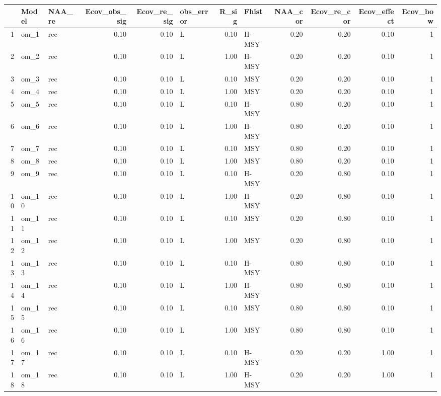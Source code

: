 \begin{table}[ht]
\centering
\begin{tabular}{rllrrlrlrrrr}
  \hline
 & Model & NAA\_re & Ecov\_obs\_sig & Ecov\_re\_sig & obs\_error & R\_sig & Fhist & NAA\_cor & Ecov\_re\_cor & Ecov\_effect & Ecov\_how \\ 
  \hline
1 & om\_1 & rec & 0.10 & 0.10 & L & 0.10 & H-MSY & 0.20 & 0.20 & 0.10 &   1 \\ 
  2 & om\_2 & rec & 0.10 & 0.10 & L & 1.00 & H-MSY & 0.20 & 0.20 & 0.10 &   1 \\ 
  3 & om\_3 & rec & 0.10 & 0.10 & L & 0.10 & MSY & 0.20 & 0.20 & 0.10 &   1 \\ 
  4 & om\_4 & rec & 0.10 & 0.10 & L & 1.00 & MSY & 0.20 & 0.20 & 0.10 &   1 \\ 
  5 & om\_5 & rec & 0.10 & 0.10 & L & 0.10 & H-MSY & 0.80 & 0.20 & 0.10 &   1 \\ 
  6 & om\_6 & rec & 0.10 & 0.10 & L & 1.00 & H-MSY & 0.80 & 0.20 & 0.10 &   1 \\ 
  7 & om\_7 & rec & 0.10 & 0.10 & L & 0.10 & MSY & 0.80 & 0.20 & 0.10 &   1 \\ 
  8 & om\_8 & rec & 0.10 & 0.10 & L & 1.00 & MSY & 0.80 & 0.20 & 0.10 &   1 \\ 
  9 & om\_9 & rec & 0.10 & 0.10 & L & 0.10 & H-MSY & 0.20 & 0.80 & 0.10 &   1 \\ 
  10 & om\_10 & rec & 0.10 & 0.10 & L & 1.00 & H-MSY & 0.20 & 0.80 & 0.10 &   1 \\ 
  11 & om\_11 & rec & 0.10 & 0.10 & L & 0.10 & MSY & 0.20 & 0.80 & 0.10 &   1 \\ 
  12 & om\_12 & rec & 0.10 & 0.10 & L & 1.00 & MSY & 0.20 & 0.80 & 0.10 &   1 \\ 
  13 & om\_13 & rec & 0.10 & 0.10 & L & 0.10 & H-MSY & 0.80 & 0.80 & 0.10 &   1 \\ 
  14 & om\_14 & rec & 0.10 & 0.10 & L & 1.00 & H-MSY & 0.80 & 0.80 & 0.10 &   1 \\ 
  15 & om\_15 & rec & 0.10 & 0.10 & L & 0.10 & MSY & 0.80 & 0.80 & 0.10 &   1 \\ 
  16 & om\_16 & rec & 0.10 & 0.10 & L & 1.00 & MSY & 0.80 & 0.80 & 0.10 &   1 \\ 
  17 & om\_17 & rec & 0.10 & 0.10 & L & 0.10 & H-MSY & 0.20 & 0.20 & 1.00 &   1 \\ 
  18 & om\_18 & rec & 0.10 & 0.10 & L & 1.00 & H-MSY & 0.20 & 0.20 & 1.00 &   1 \\ 

\end{tabular}
\end{table}
